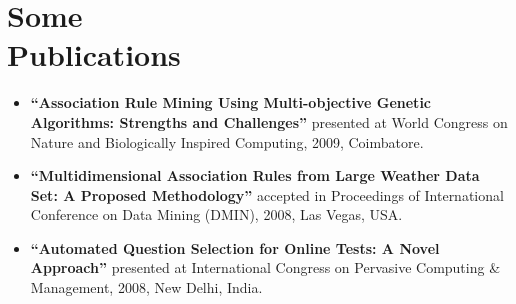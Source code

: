 \documentclass{article}
\begin{document}
\section{Some \\ Publications}
\begin{itemize}[leftmargin=-1ex]\setlength\itemsep{0.25em}\vspace{-10pt}
\item \textbf{``Association Rule Mining Using Multi-objective Genetic Algorithms: Strengths and Challenges''} presented at World Congress on Nature and Biologically Inspired Computing, 2009, Coimbatore. 
\item \textbf{``Multidimensional Association Rules from Large Weather Data Set: A Proposed Methodology''} accepted in Proceedings of International Conference on  Data Mining (DMIN), 2008, Las Vegas, USA. 
\item \textbf{``Automated Question Selection for Online Tests: A Novel Approach''} presented at International Congress on Pervasive Computing \& Management, 2008, New Delhi, India. 
\end{itemize}
	
\end{document}
